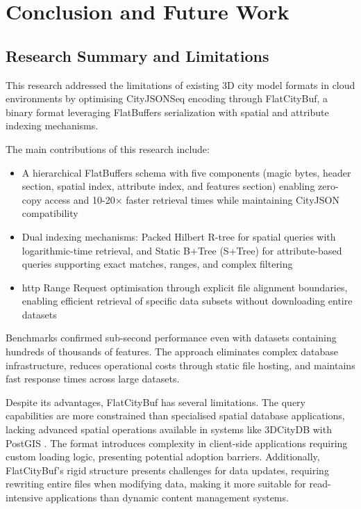 \chapter{Conclusion and Future Work}
\label{chp:conclusion}

\section{Research Summary and Limitations}
\label{conclusion:research_summary}

This research addressed the limitations of existing 3D city model formats in cloud environments by optimising CityJSONSeq encoding through FlatCityBuf, a binary format leveraging FlatBuffers serialization with spatial and attribute indexing mechanisms.

The main contributions of this research include:

\begin{itemize}
  \item A hierarchical FlatBuffers schema with five components (magic bytes, header section, spatial index, attribute index, and features section) enabling zero-copy access and 10-20× faster retrieval times while maintaining CityJSON compatibility

  \item Dual indexing mechanisms: Packed Hilbert R-tree for spatial queries with logarithmic-time retrieval, and Static B+Tree (S+Tree) for attribute-based queries supporting exact matches, ranges, and complex filtering

  \item \ac{http} Range Request optimisation through explicit file alignment boundaries, enabling efficient retrieval of specific data subsets without downloading entire datasets
\end{itemize}

Benchmarks confirmed sub-second performance even with datasets containing hundreds of thousands of features. The approach eliminates complex database infrastructure, reduces operational costs through static file hosting, and maintains fast response times across large datasets.

Despite its advantages, FlatCityBuf has several limitations. The query capabilities are more constrained than specialised spatial database applications, lacking advanced spatial operations available in systems like 3DCityDB \citep{3dcitydb} with PostGIS \citep{postgis}. The format introduces complexity in client-side applications requiring custom loading logic, presenting potential adoption barriers. Additionally, FlatCityBuf's rigid structure presents challenges for data updates, requiring rewriting entire files when modifying data, making it more suitable for read-intensive applications than dynamic content management systems.


